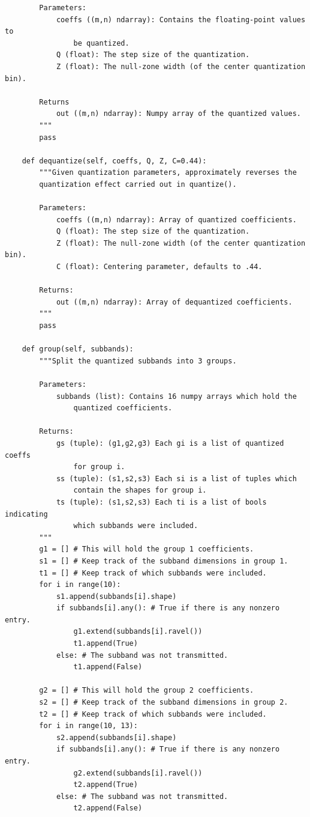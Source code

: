\begin{lstlisting}
        Parameters:
            coeffs ((m,n) ndarray): Contains the floating-point values to
                be quantized.
            Q (float): The step size of the quantization.
            Z (float): The null-zone width (of the center quantization bin).

        Returns
            out ((m,n) ndarray): Numpy array of the quantized values.
        """
        pass

    def dequantize(self, coeffs, Q, Z, C=0.44):
        """Given quantization parameters, approximately reverses the
        quantization effect carried out in quantize().

        Parameters:
            coeffs ((m,n) ndarray): Array of quantized coefficients.
            Q (float): The step size of the quantization.
            Z (float): The null-zone width (of the center quantization bin).
            C (float): Centering parameter, defaults to .44.

        Returns:
            out ((m,n) ndarray): Array of dequantized coefficients.
        """
        pass

    def group(self, subbands):
        """Split the quantized subbands into 3 groups.

        Parameters:
            subbands (list): Contains 16 numpy arrays which hold the
                quantized coefficients.

        Returns:
            gs (tuple): (g1,g2,g3) Each gi is a list of quantized coeffs
                for group i.
            ss (tuple): (s1,s2,s3) Each si is a list of tuples which
                contain the shapes for group i.
            ts (tuple): (s1,s2,s3) Each ti is a list of bools indicating
                which subbands were included.
        """
        g1 = [] # This will hold the group 1 coefficients.
        s1 = [] # Keep track of the subband dimensions in group 1.
        t1 = [] # Keep track of which subbands were included.
        for i in range(10):
            s1.append(subbands[i].shape)
            if subbands[i].any(): # True if there is any nonzero entry.
                g1.extend(subbands[i].ravel())
                t1.append(True)
            else: # The subband was not transmitted.
                t1.append(False)

        g2 = [] # This will hold the group 2 coefficients.
        s2 = [] # Keep track of the subband dimensions in group 2.
        t2 = [] # Keep track of which subbands were included.
        for i in range(10, 13):
            s2.append(subbands[i].shape)
            if subbands[i].any(): # True if there is any nonzero entry.
                g2.extend(subbands[i].ravel())
                t2.append(True)
            else: # The subband was not transmitted.
                t2.append(False)


\end{lstlisting}

